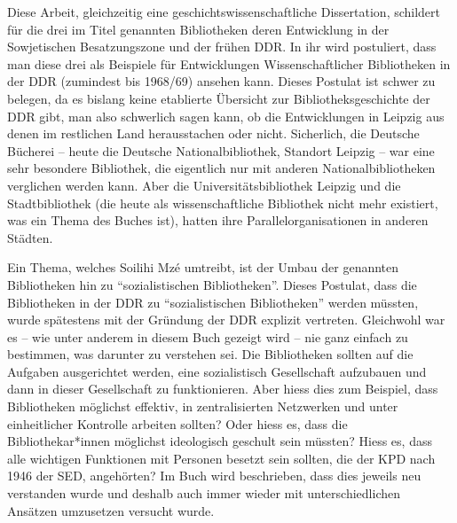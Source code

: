 \documentclass[a4paper,
fontsize=11pt,
oneside,
numbers=noperiodatend,
parskip=half-,
bibliography=totoc,
final
]{scrartcl}
\begin{document}
Diese Arbeit, gleichzeitig eine geschichtswissenschaftliche
Dissertation, schildert für die drei im Titel genannten Bibliotheken
deren Entwicklung in der Sowjetischen Besatzungszone und der frühen DDR.
In ihr wird postuliert, dass man diese drei als Beispiele für
Entwicklungen Wissenschaftlicher Bibliotheken in der DDR (zumindest bis
1968/69) ansehen kann. Dieses Postulat ist schwer zu belegen, da es
bislang keine etablierte Übersicht zur Bibliotheksgeschichte der DDR
gibt, man also schwerlich sagen kann, ob die Entwicklungen in Leipzig
aus denen im restlichen Land herausstachen oder nicht. Sicherlich, die
Deutsche Bücherei -- heute die Deutsche Nationalbibliothek, Standort
Leipzig -- war eine sehr besondere Bibliothek, die eigentlich nur mit
anderen Nationalbibliotheken verglichen werden kann. Aber die
Universitätsbibliothek Leipzig und die Stadtbibliothek (die heute als
wissenschaftliche Bibliothek nicht mehr existiert, was ein Thema des
Buches ist), hatten ihre Parallelorganisationen in anderen Städten.

Ein Thema, welches Soilihi Mzé umtreibt, ist der Umbau der genannten
Bibliotheken hin zu \enquote{sozialistischen Bibliotheken}. Dieses
Postulat, dass die Bibliotheken in der DDR zu \enquote{sozialistischen
Bibliotheken} werden müssten, wurde spätestens mit der Gründung der DDR
explizit vertreten. Gleichwohl war es -- wie unter anderem in diesem
Buch gezeigt wird -- nie ganz einfach zu bestimmen, was darunter zu
verstehen sei. Die Bibliotheken sollten auf die Aufgaben ausgerichtet
werden, eine sozialistisch Gesellschaft aufzubauen und dann in dieser
Gesellschaft zu funktionieren. Aber hiess dies zum Beispiel, dass
Bibliotheken möglichst effektiv, in zentralisierten Netzwerken und unter
einheitlicher Kontrolle arbeiten sollten? Oder hiess es, dass die
Bibliothekar*innen möglichst ideologisch geschult sein müssten? Hiess
es, dass alle wichtigen Funktionen mit Personen besetzt sein sollten,
die der KPD nach 1946 der SED, angehörten? Im Buch wird beschrieben,
dass dies jeweils neu verstanden wurde und deshalb auch immer wieder mit
unterschiedlichen Ansätzen umzusetzen versucht wurde.
\end{document}
